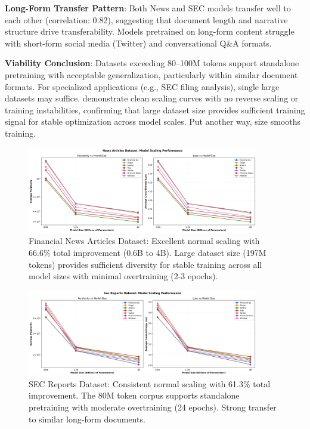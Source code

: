 \textbf{Long-Form Transfer Pattern}: Both News and SEC models transfer well to each other (correlation: 0.82), suggesting that document length and narrative structure drive transferability. Models pretrained on long-form content struggle with short-form social media (Twitter) and conversational Q\&A formats.

\textbf{Viability Conclusion}: Datasets exceeding 80–100M tokens support standalone pretraining with acceptable generalization, particularly within similar document formats. For specialized applications (e.g., SEC filing analysis), single large datasets may suffice.  demonstrate clean scaling curves with no reverse scaling or training instabilities, confirming that large dataset size provides sufficient training signal for stable optimization across model scales. Put another way, size smooths training.

\begin{figure}[h]
\centering
\includegraphics[width=0.9\textwidth]{figures/scaling_news_articles.png}
\caption[Financial News Dataset: Scaling Behavior]{Financial News Articles Dataset: Excellent normal scaling with 66.6\% total improvement (0.6B to 4B). Large dataset size (197M tokens) provides sufficient diversity for stable training across all model sizes with minimal overtraining (2-3 epochs).}
\label{fig:scaling_news_articles}
\end{figure}

\begin{figure}[h]
\centering
\includegraphics[width=0.9\textwidth]{figures/scaling_sec_reports.png}
\caption[SEC Reports Dataset: Scaling Behavior]{SEC Reports Dataset: Consistent normal scaling with 61.3\% total improvement. The 80M token corpus supports standalone pretraining with moderate overtraining (24 epochs). Strong transfer to similar long-form documents.}
\label{fig:scaling_sec_reports}
\end{figure}

